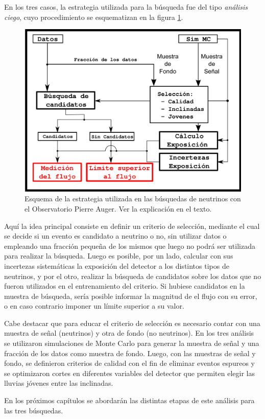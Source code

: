 En los tres casos, la estrategia utilizada para la búsqueda fue del tipo \emph{análisis ciego}, cuyo procedimiento se esquematizan en la figura \ref{fig:strAuger}.
%
\begin{figure}[ht!]
	\centering
	\includegraphics[width=\textwidth]{./fig/estrategiaAuger/analysisSchema}
	\caption{\label{fig:strAuger}
	Esquema de la estrategia utilizada en las búsquedas de neutrinos con el Observatorio Pierre Auger. Ver la explicación en el texto.
	}
\end{figure}
%
Aqu\'i la idea principal consiste en definir un criterio de selección, mediante el cual se decide si un evento es candidato a neutrino o no, sin utilizar datos o empleando una fracción peque\~na de los mismos que luego no podrá ser utilizada para realizar la búsqueda.
Luego es posible, por un lado, calcular con sus incertezas sistemáticas la exposición del detector a los distintos tipos de neutrinos, y por el otro, realizar la búsqueda de candidatos sobre los datos que no fueron utilizados en el entrenamiento del criterio.
Si hubiese candidatos en la muestra de b\'usqueda, sería posible informar la magnitud de el flujo con su error, o en caso contrario imponer un l\'imite superior a su valor.

Cabe destacar que para educar el criterio de selección es necesario contar con una muestra de señal (neutrinos) y otra de fondo (no neutrinos).
En los tres análisis se utilizaron simulaciones de Monte Carlo para generar la muestra de señal y una fracción de los datos como muestra de fondo.
Luego, con las muestras de señal y fondo, se definieron criterios de calidad con el fin de eliminar eventos espureos y se optimizaron cortes en diferentes variables del detector que permiten elegir las lluvias jóvenes entre las inclinadas. 

En los próximos capítulos se abordarán las distintas etapas de este análisis para las tres búsquedas.

